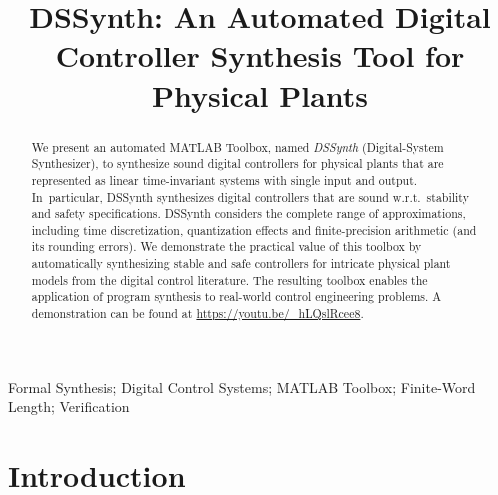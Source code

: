 \documentclass[conference]{IEEEtran}
\begin{document}
\title{DSSynth: An Automated Digital Controller Synthesis Tool for Physical Plants} 

\author{
}

\maketitle

\begin{abstract}
%
We present an automated MATLAB Toolbox, named \emph{DSSynth} (Digital-System
Synthesizer), to synthesize sound digital controllers for physical plants
that are represented as linear time-invariant systems with single input and
output.  In~particular, DSSynth synthesizes digital controllers that are
sound w.r.t.~stability and safety specifications.  DSSynth considers the
complete range of approximations, including time discretization,
quantization effects and finite-precision arithmetic (and its rounding
errors).  We demonstrate the practical value of
this toolbox by automatically synthesizing stable and safe controllers for intricate
physical plant models from the digital control literature.
The resulting toolbox enables the application of program synthesis
to real-world control engineering problems. A demonstration can be found at 
\url{https://youtu.be/_hLQslRcee8}.
%
\end{abstract}

%
%
\begin{IEEEkeywords}
Formal Synthesis; Digital Control Systems; MATLAB Toolbox; Finite-Word Length; Verification
\end{IEEEkeywords}

\section{Introduction}
\end{document}
